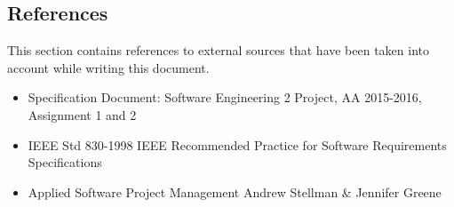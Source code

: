 \subsection{References}
This section contains references to external sources that have been taken into account while writing this document.
\begin{itemize}
   \item Specification Document: Software Engineering 2 Project, AA 2015-2016, Assignment 1 and 2
   \item IEEE Std 830-1998 IEEE Recommended Practice for Software Requirements Specifications
   \item Applied Software Project Management Andrew Stellman \& Jennifer Greene
\end{itemize}